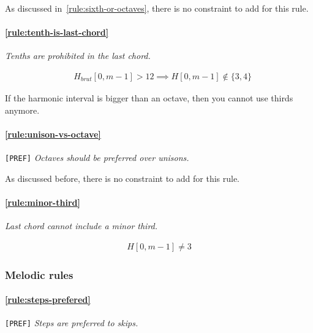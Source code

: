     As discussed in~\ref{rule:sixth-or-octaves}, there is no constraint to add for this rule.
    
    \paragraph{\hspace{.6cm}\ref{rule:tenth-is-last-chord}}  \textit{Tenths are prohibited in the last chord.}

    \begin{equation} \begin{aligned}
    &H_{brut}[0, m-1] > 12 \implies H[0, m-1] \notin \{3, 4\}
    \end{aligned} \end{equation}

    If the harmonic interval is bigger than an octave, then you cannot use thirds anymore.

    \paragraph{\hspace{.6cm}\ref{rule:unison-vs-octave}} \texttt{[PREF]} \textit{Octaves should be preferred over unisons.}

    As discussed before, there is no constraint to add for this rule.

    \paragraph{\hspace{.6cm}\ref{rule:minor-third}}  \textit{Last chord cannot include a minor third.}

    \begin{equation} \begin{aligned}
    H[0, m-1] \neq 3
    \end{aligned} \end{equation}

\subsubsection{Melodic rules}
\paragraph{\hspace{.6cm}\ref{rule:steps-prefered}} \texttt{[PREF]} \textit{Steps are preferred to skips.}

